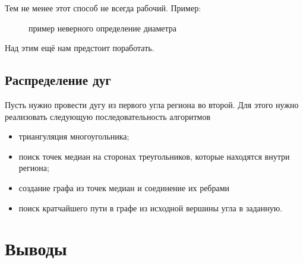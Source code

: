 \documentclass[a4paper, 14pt]{article}
\begin{document}
 	
 	Тем не менее этот способ не всегда рабочий. Пример:
 	
 	
 	\begin{figure}[h]
 		\caption{пример неверного определение диаметра }
 		\label{marked}
 	\end{figure}
 	
 	
 	Над этим ещё нам предстоит поработать.


	 
		
	\subsection{Распределение дуг}
	
	Пусть нужно провести дугу из первого угла региона во второй. Для этого нужно реализовать следующую последовательность алгоритмов 
	\begin{itemize}
		\item триангуляция многоугольника;
		
		\item поиск точек медиан на сторонах треугольников, которые находятся внутри региона;
		
		\item создание графа из точек медиан и соединение их ребрами 
		
		\item поиск кратчайшего пути в графе из исходной вершины угла в заданную.
	\end{itemize}
	
	
	

\section{Выводы}
\end{document}
